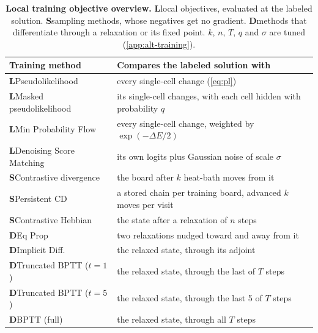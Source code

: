\documentclass{article}
\newcommand{\TableLabel}[1]{\textsf{#1}}
\newlength{\AltInitialWidth}
\newcommand{\AltInitial}[1]{\settowidth{\AltInitialWidth}{\textbf{#1}}\textbf{#1}\llap{\makebox[\AltInitialWidth][c]{{\color{black!45}\setlength{\fboxsep}{0.4pt}\setlength{\fboxrule}{0.7pt}\fbox{\phantom{\textbf{#1}}\vphantom{L}}}}}}
\newcommand{\AltClass}[1]{\kern1.1pt\AltInitial{#1}\kern1.1pt\hspace{0.4em}}
\begin{document}
\begin{table}[ht]
\centering
\caption{\textbf{Local training objective overview.} \protect\AltClass{L}local objectives, evaluated at the labeled solution. \protect\AltClass{S}sampling methods, whose negatives get no gradient. \protect\AltClass{D}methods that differentiate through a relaxation or its fixed point. $k$, $n$, $T$, $q$ and $\sigma$ are tuned (\cref{app:alt-training}).}
\label{tab:methods}
\small
\begingroup
\setlength{\tabcolsep}{3.9pt}
\renewcommand{\arraystretch}{1.18}
\begin{tabular*}{\linewidth}{@{\extracolsep{\fill}}ll@{}}
\toprule
\textbf{\TableLabel{Training method}} & \textbf{\TableLabel{Compares the labeled solution with}}\\
\midrule
\AltClass{L}Pseudolikelihood~{\color{black!50}\hypersetup{citecolor=black!50}\citep{besag1975}} & every single-cell change (\cref{eq:pl})\\
\AltClass{L}Masked pseudolikelihood~{\color{black!50}\hypersetup{citecolor=black!50}\citep{epll2025}} & its single-cell changes, with each cell hidden with probability $q$\\
\AltClass{L}Min Probability Flow~{\color{black!50}\hypersetup{citecolor=black!50}\citep{sohldickstein2011}} & every single-cell change, weighted by $\exp(-\Delta E/2)$\\
\AltClass{L}Denoising Score Matching~{\color{black!50}\hypersetup{citecolor=black!50}\citep{vincent2011}} & its own logits plus Gaussian noise of scale $\sigma$\\
\addlinespace[2pt]
\AltClass{S}Contrastive divergence~{\color{black!50}\hypersetup{citecolor=black!50}\citep{hinton2002}} & the board after $k$ heat-bath moves from it\\
\AltClass{S}Persistent CD~{\color{black!50}\hypersetup{citecolor=black!50}\citep{tieleman2008}} & a stored chain per training board, advanced $k$ moves per visit\\
\AltClass{S}Contrastive Hebbian~{\color{black!50}\hypersetup{citecolor=black!50}\citep{movellan1991}} & the state after a relaxation of $n$ steps\\
\addlinespace[2pt]
\AltClass{D}Eq Prop~{\color{black!50}\hypersetup{citecolor=black!50}\citep{scellier2017}} & two relaxations nudged toward and away from it\\
\AltClass{D}Implicit Diff.~{\color{black!50}\hypersetup{citecolor=black!50}\citep{deq2019}} & the relaxed state, through its adjoint\\
\AltClass{D}Truncated BPTT ($t{=}1$)~{\color{black!50}\hypersetup{citecolor=black!50}\citep{hrm2025}} & the relaxed state, through the last of $T$ steps\\
\AltClass{D}Truncated BPTT ($t{=}5$)~{\color{black!50}\hypersetup{citecolor=black!50}\citep{werbos1990}} & the relaxed state, through the last 5 of $T$ steps\\
\AltClass{D}BPTT (full)~{\color{black!50}\hypersetup{citecolor=black!50}\citep{werbos1990}} & the relaxed state, through all $T$ steps\\
\bottomrule
\end{tabular*}
\endgroup
\end{table}
\end{document}
